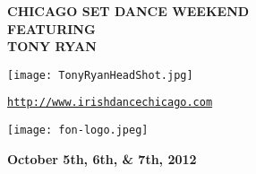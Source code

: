 \documentclass[letterpaper]{article}
\begin{document}

\begin{center}
\fontsize{36}{25} \bfseries CHICAGO SET DANCE WEEKEND\\
\fontsize{14}{16} \bfseries{\vspace*{1em}FEATURING\\}
\fontsize{18}{22}\bfseries TONY RYAN\\
\end{center}

\vspace*{0.45em}
\vspace*{0.45em}
\begin{center}
\texttt{[image: TonyRyanHeadShot.jpg]}
\end{center}

\begin{center}
\vspace*{2em}
{\normalsize \href{http://www.irishdancechicago.com}{\tt http://www.irishdancechicago.com} }
\end{center}
\begin{center}
\texttt{[image: fon-logo.jpeg]}
\end{center}
\begin{center}
\sffamily
\fontsize{24}{16} \bfseries{October 5th, 6th, \&  7th, 2012}
\end{center}
 
\end{document}

